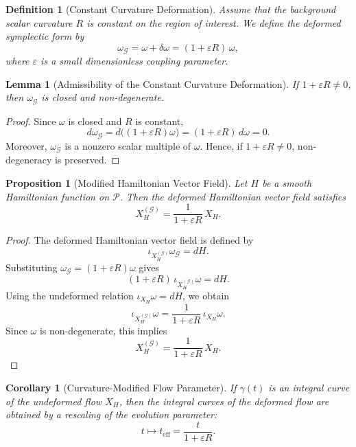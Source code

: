 \documentclass[11pt, a4paper]{article}
\newtheorem{lemma}[theorem]{Lemma}
\newtheorem{proposition}[theorem]{Proposition}
\newtheorem{definition}[theorem]{Definition}
\newtheorem{corollary}[theorem]{Corollary}
\begin{document}
\begin{definition}[Constant Curvature Deformation]
Assume that the background scalar curvature $R$ is constant on the region of
interest. We define the deformed symplectic form by
\[
\omega_{\mathcal{G}} = \omega + \delta\omega
= (1+\varepsilon R)\,\omega,
\]
where $\varepsilon$ is a small dimensionless coupling parameter.
\end{definition}

\begin{lemma}[Admissibility of the Constant Curvature Deformation]
If $1+\varepsilon R \neq 0$, then $\omega_{\mathcal{G}}$ is closed and
non-degenerate.
\end{lemma}

\begin{proof}
Since $\omega$ is closed and $R$ is constant,
\[
d\omega_{\mathcal{G}} = d\bigl((1+\varepsilon R)\omega\bigr)
= (1+\varepsilon R)\,d\omega = 0.
\]
Moreover, $\omega_{\mathcal{G}}$ is a nonzero scalar multiple of $\omega$.
Hence, if $1+\varepsilon R \neq 0$, non-degeneracy is preserved.
\end{proof}

\begin{proposition}[Modified Hamiltonian Vector Field]
Let $H$ be a smooth Hamiltonian function on $\mathcal{P}$. Then the deformed
Hamiltonian vector field satisfies
\[
X_H^{(\mathcal{G})} = \frac{1}{1+\varepsilon R}\,X_H.
\]
\end{proposition}

\begin{proof}
The deformed Hamiltonian vector field is defined by
\[
\iota_{X_H^{(\mathcal{G})}}\omega_{\mathcal{G}} = dH.
\]
Substituting $\omega_{\mathcal{G}}=(1+\varepsilon R)\omega$ gives
\[
(1+\varepsilon R)\,\iota_{X_H^{(\mathcal{G})}}\omega = dH.
\]
Using the undeformed relation $\iota_{X_H}\omega=dH$, we obtain
\[
\iota_{X_H^{(\mathcal{G})}}\omega
= \frac{1}{1+\varepsilon R}\,\iota_{X_H}\omega.
\]
Since $\omega$ is non-degenerate, this implies
\[
X_H^{(\mathcal{G})} = \frac{1}{1+\varepsilon R}\,X_H.
\]
\end{proof}

\begin{corollary}[Curvature-Modified Flow Parameter]
If $\gamma(t)$ is an integral curve of the undeformed flow $X_H$, then the
integral curves of the deformed flow are obtained by a rescaling of the
evolution parameter:
\[
t \mapsto t_{\mathrm{eff}} = \frac{t}{1+\varepsilon R}.
\]
\end{corollary}
\end{document}
